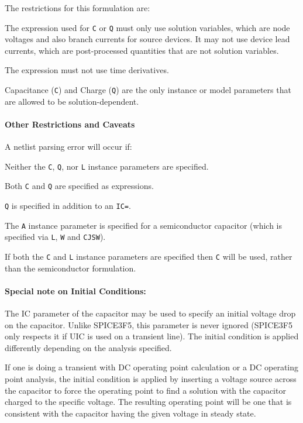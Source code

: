 The restrictions for this formulation are:
\begin{XyceItemize}
  \item The expression used for \texttt{C} or \texttt{Q} must only use
    solution variables, which are node voltages and also branch
    currents for source devices.  It may not use device lead currents,
    which are post-processed quantities that are not solution variables.
  \item The expression must not use time derivatives.
  \item Capacitance (\texttt{C}) and Charge (\texttt{Q}) are the only
    instance or model parameters that are allowed to be
    solution-dependent.
\end{XyceItemize}

\paragraph{Other Restrictions and Caveats}
A netlist parsing error will occur if:
\begin{XyceItemize}
  \item Neither the \texttt{C}, \texttt{Q}, nor \texttt{L} instance
    parameters are specified.
  \item Both \texttt{C} and \texttt{Q} are specified as expressions.
    \item \texttt{Q} is specified in addition to an \texttt{IC=}.
  \item The \texttt{A} instance parameter is specified for a semiconductor 
      capacitor (which is specified via \texttt{L}, \texttt{W} and \texttt{CJSW}).
\end{XyceItemize}
If both the \texttt{C} and \texttt{L} instance parameters are specified then 
\texttt{C} will be used, rather than the semiconductor formulation. 

\paragraph{Special note on Initial Conditions:}

The IC parameter of the capacitor may be used to specify an initial
voltage drop on the capacitor.  Unlike SPICE3F5, this parameter is
never ignored (SPICE3F5 only respects it if UIC is used on a transient
line).  The initial condition is applied differently depending on the
analysis specified.

If one is doing a transient with DC operating point calculation or a
DC operating point analysis, the initial condition is applied by
inserting a voltage source across the capacitor to force the operating
point to find a solution with the capacitor charged to the specific
voltage.  The resulting operating point will be one that is consistent
with the capacitor having the given voltage in steady state.

